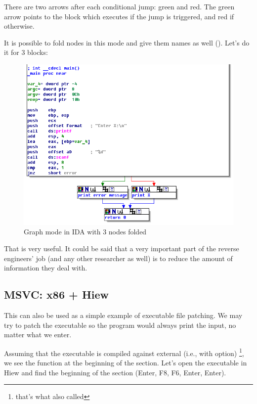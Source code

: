 There are two arrows after each conditional jump: green and red.
The green arrow points to the block which executes if the jump is triggered, and red if otherwise.

\clearpage
It is possible to fold nodes in this mode and give them names as well ().
Let's do it for 3 blocks:

\begin{figure}[H]
\centering
\includegraphics[scale=\FigScale]{patterns/04_scanf/3_checking_retval/IDA2.png}
\caption{Graph mode in IDA with 3 nodes folded}
\label{fig:ex3_IDA_2}
\end{figure}

That is very useful.
It could be said that a very important part of the reverse engineers' job (and any other researcher as well) is to reduce the amount of information they deal with.

\ifdefined\IncludeOlly

\fi

\clearpage
\subsection{MSVC: x86 + Hiew}

This can also be used as a simple example of executable file patching.
We may try to patch the executable so the program would always print the input, no matter what we enter.

Assuming that the executable is compiled against external  (i.e., with  option)
\footnote{that's what also called }, 
we see the \main function at the beginning of the  section.
Let's open the executable in Hiew and find the beginning of the  section (Enter, F8, F6, Enter, Enter).

